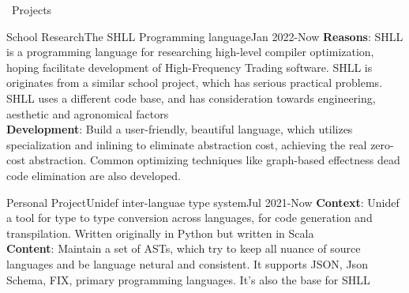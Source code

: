 \documentclass{resume}
\begin{document}
\begin{rSection}{\faUsers~Projects}
    \begin{rProject}{School Research}{The SHLL Programming language}{Jan 2022-Now}
        \textbf{Reasons}: SHLL is a programming language for researching high-level compiler optimization, hoping facilitate development of High-Frequency Trading software. SHLL is originates from a similar school project, which has serious practical problems. SHLL uses a different code base, and has consideration towards  engineering, aesthetic and agronomical factors\\
        \textbf{Development}: Build a user-friendly, beautiful language, which utilizes specialization and inlining to eliminate abstraction cost, achieving the real zero-cost abstraction. Common optimizing techniques like graph-based effectness dead code elimination are also developed.
    \end{rProject}
    \begin{rProject}{Personal Project}{Unidef inter-languae type system}{Jul 2021-Now}
        \textbf{Context}: Unidef a tool for type to type conversion across languages, for code generation and transpilation. Written originally in Python but written in Scala\\
        \textbf{Content}: Maintain a set of ASTs, which try to keep all nuance of source languages and be language netural and consistent. It supports JSON, Json Schema, FIX, primary programming languages. It's also the base for SHLL
    \end{rProject}


\end{rSection}
\end{document}
